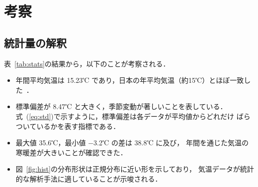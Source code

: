 \documentclass[12pt,a4paper]{ltjsarticle}
\begin{document}


\section{考察}\label{sec:discussion}

\subsection{統計量の解釈}

表~\ref{tab:stats}の結果から，以下のことが考察される．

\begin{itemize}
  \item 年間平均気温は 15.23℃ であり，日本の年平均気温（約15℃）とほぼ一致した~\cite{jma}．
  \item 標準偏差が 8.47℃ と大きく，季節変動が著しいことを表している．
        式~(\ref{eq:std})で示すように，標準偏差は各データが平均値からどれだけ
        ばらついているかを表す指標である．
  \item 最大値 35.6℃，最小値 −3.2℃ の差は 38.8℃ に及び，
        年間を通じた気温の寒暖差が大きいことが確認できた．
  \item 図~\ref{fig:hist}の分布形状は正規分布に近い形を示しており，
        気温データが統計的な解析手法に適していることが示唆される．
\end{itemize}
\end{document}
